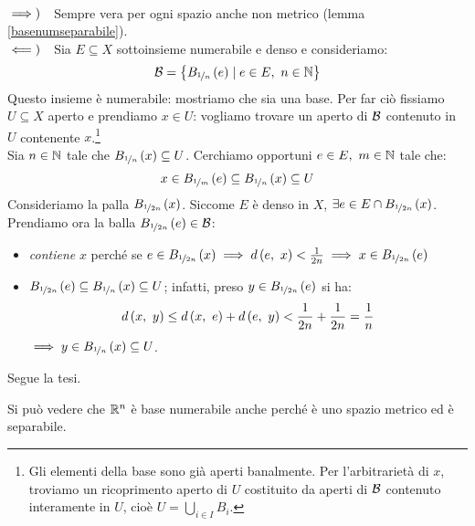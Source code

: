\begin{demonstration}~{}\\
$\implies)\quad$Sempre vera per ogni spazio anche non metrico (lemma \ref{basenumseparabile}).\\
$\impliedby)\quad$Sia $E\subseteq X$ sottoinsieme numerabile e denso e consideriamo:
\begin{equation*}
	\mathcal{B}=\left\{B_{\nicefrac{1}{n}}\left(e\right)\mid e\in E,\ n\in \mathbb{N}\right\}
\end{equation*}
Questo insieme è numerabile: mostriamo che sia una base. Per far ciò fissiamo $U\subseteq X$ aperto e prendiamo $x\in U$: vogliamo trovare un aperto di $\mathcal{B}$ contenuto in $U$ contenente $x$.\footnote{Gli elementi della base sono già aperti banalmente. Per l'arbitrarietà di $x$, troviamo un ricoprimento aperto di $U$ costituito da aperti di $\mathcal{B}$ contenuto interamente in $U$, cioè $\displaystyle U=\bigcup_{i\in I}B_i$.}\\
Sia $n\in\mathbb{N}$ tale che $B_{\nicefrac{1}{n}}\left(x\right)\subseteq U$. Cerchiamo opportuni $e\in E,\ m\in\naturalset$ tale che:
\begin{equation*}
x\in B_{\nicefrac{1}{m}}\left(e\right)\subseteq B_{\nicefrac{1}{n}}\left(x\right)\subseteq U
\end{equation*}
Consideriamo la palla $B_{\nicefrac{1}{2n}}\left(x\right)$. Siccome $E$ è denso in $X$, $\exists e\in E\cap B_{\nicefrac{1}{2n}}\left(x\right)$.\\
Prendiamo ora la balla $B_{\nicefrac{1}{2n}}\left(e\right)\in\mathcal{B}$:
\begin{itemize}
	\item \textit{contiene} $x$ perché se $e\in B_{\nicefrac{1}{2n}}\left(x\right)\implies d\left(e,\ x\right)<\frac{1}{2n}\implies x\in B_{\nicefrac{1}{2n}}\left(e\right)$
	\item $B_{\nicefrac{1}{2n}}\left(e\right)\subseteq B_{\nicefrac{1}{n}}\left(x\right)\subseteq U$; infatti, preso $y\in B_{\nicefrac{1}{2n}}\left(e\right)$ si ha:
	\begin{equation*}
		d\left(x,\ y\right)\leq d\left(x,\ e\right)+d\left(e,\ y\right)<\frac{1}{2n}+\frac{1}{2n}=\frac{1}{n}
	\end{equation*}
$\implies y\in B_{\nicefrac{1}{n}}\left(x\right) \subseteq U$.
\end{itemize}
Segue la tesi.
\end{demonstration}
\begin{example}
	Si può vedere che $\mathbb{R}^n$ è base numerabile anche perché è uno spazio metrico ed è separabile.
\end{example}
